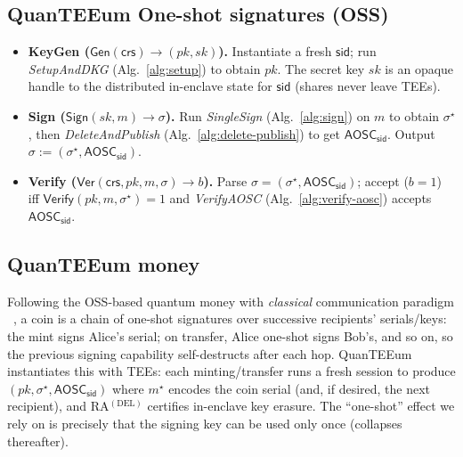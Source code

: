 \documentclass[runningheads,orivec]{llncs}
\newcommand{\prot}{\textsf{QuanTEEum}}
\newcommand{\sid}{\mathsf{sid}}
\begin{document}
\subsection{\prot{} One-shot signatures (OSS)}\label{sec:app-oss}
\begin{itemize}[leftmargin=*,itemsep=0.25em]
  \item \textbf{KeyGen (\(\mathsf{Gen}(\mathsf{crs})\!\to\!(pk,sk)\)).} Instantiate a fresh \(\sid\); run \emph{SetupAndDKG} (Alg.~\ref{alg:setup}) to obtain \(pk\). The secret key \(sk\) is an opaque handle to the distributed in-enclave state for \(\sid\) (shares never leave TEEs).
  \item \textbf{Sign (\(\mathsf{Sign}(sk,m)\!\to\!\sigma\)).} Run \emph{SingleSign} (Alg.~\ref{alg:sign}) on \(m\) to obtain \(\sigma^{\star}\), then \emph{DeleteAndPublish} (Alg.~\ref{alg:delete-publish}) to get \(\mathsf{AOSC}_{\sid}\). Output \(\sigma := (\sigma^{\star}, \mathsf{AOSC}_{\sid})\).
  \item \textbf{Verify (\(\mathsf{Ver}(\mathsf{crs},pk,m,\sigma)\!\to\! b\)).} Parse \(\sigma=(\sigma^{\star},\mathsf{AOSC}_{\sid})\); accept (\(b{=}1\)) iff \(\mathsf{Verify}(pk,m,\sigma^{\star})=1\) and \emph{VerifyAOSC} (Alg.~\ref{alg:verify-aosc}) accepts \(\mathsf{AOSC}_{\sid}\).
\end{itemize}

\subsection{QuanTEEum money}
Following the OSS-based quantum money with \emph{classical} communication paradigm ~\cite{shmueli2025one}, a coin is a chain of one-shot signatures over successive recipients’ serials/keys: the mint signs Alice’s serial; on transfer, Alice one-shot signs Bob’s, and so on, so the previous signing capability self-destructs after each hop. \prot{} instantiates this with TEEs: each minting/transfer runs a fresh session to produce $(pk,\sigma^{\star},\mathsf{AOSC}_\sid)$ where $m^{\star}$ encodes the coin serial (and, if desired, the next recipient), and RA$^{(\mathrm{DEL})}$ certifies in-enclave key erasure. The “one-shot” effect we rely on is precisely that the signing key can be used only once (collapses thereafter).
\end{document}
